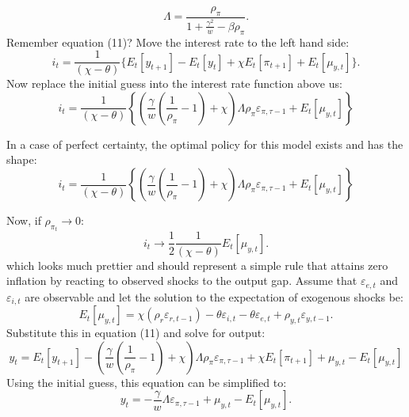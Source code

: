 \documentclass{beamer}
\begin{document}
\begin{frame} 
\begin{equation}
\Lambda = \frac{\rho_\pi}{1+\frac{\gamma^2}{w} - \beta \rho_\pi}.
\end{equation}
Remember equation (11)? Move the interest rate to the left hand side:
\begin{equation}
i_t = \frac{1}{(\chi-\theta)} \{E_t[y_{t+1}] - E_t[y_t] + \chi E_t [\pi_{t+1}] + E_t[\mu_{y,t}]
\}.
\end{equation}
Now replace the initial guess into the interest rate function above us:
\begin{equation}
i_t = \frac{1}{(\chi-\theta)} \left \{ \left ( \frac{\gamma}{w} (\frac{1}{\rho_\pi} - 1) + \chi \right ) \Lambda \rho_\pi \varepsilon_{\pi,\tau-1} + E_t [\mu_{y,t}] \right \}
\end{equation}
\begin{theorem}
In a case of perfect certainty, the optimal policy for this model exists and has
the shape:
\begin{equation}
i_t = \frac{1}{(\chi-\theta)} \left \{ \left ( \frac{\gamma}{w} (\frac{1}{\rho_\pi} - 1) + \chi \right ) \Lambda \rho_\pi \varepsilon_{\pi,\tau-1} + E_t [\mu_{y,t}] \right \}
\end{equation}
\end{theorem}
\end{frame}

\begin{frame} 
Now, if $\rho_\pi_t \to 0$:
\begin{equation}
i_t \to \frac{1}{2} \frac{1}{(\chi - \theta)} E_t [\mu_{y,t}].
\end{equation}
which looks much prettier and should represent a simple rule that attains zero
inflation by reacting to observed shocks to the output gap.
\newline
\newline
Assume that $\varepsilon_{e,t}$ and $\varepsilon_{i,t}$ are observable and let
the solution to the expectation of exogenous shocks be:
\begin{equation}
E_t[\mu_{y,t}] = \chi (\rho_r \varepsilon_{r,t-1} ) - \theta \varepsilon_{i,t} - \theta \varepsilon_{e,t} + \rho_{y,t}
\varepsilon_{y,t-1}.
\end{equation}
Substitute this in equation (11) and solve for output:
\begin{equation}
y_t = E_t [y_{t+1}] - \left ( \frac{\gamma}{w} ( \frac{1}{\rho_\pi} - 1) + \chi \right ) \Lambda \rho_\pi \varepsilon_{\pi,\tau-1} + \chi E_t[\pi_{t+1}] + \mu_{y,t} - E_t[\mu_{y,t}]
\end{equation}
Using the initial guess, this equation can be simplified to:
\begin{equation}
y_t = -\frac{\gamma}{w} \Lambda \varepsilon_{\pi,\tau-1} + \mu_{y,t} -
E_t[\mu_{y,t}].
\end{equation}
\end{frame}
\end{document}
